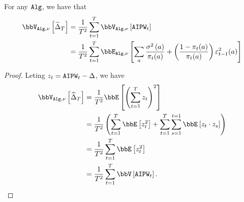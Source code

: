 \begin{lemma}\label{lem:aaipw-variance}
    For any $\texttt{Alg}$, we have that
    \begin{align}
        \V[\alg, \bandit]{\estAIPW[\numRounds]} 
            & = \frac{1}{\numRounds^2} \sum_{\round = 1}^{\numRounds} \V[\alg, \bandit]{\AIPW_\round} \\
            &=\frac{1}{\numRounds^2} \sum_{\round = 1}^{\numRounds}
                \E[\alg, \bandit]{\sum_{\aidx} \frac{\var[\aidx]}{\policy_\round(\aidx)} 
                + \paren{\frac{1 - \policy_\round(\aidx)}{\policy_\round(\aidx)}} \estRewardError^2_{\round - 1}(\aidx)
                }
    \end{align}
\end{lemma}
\begin{proof}
    Leting $z_{t} = \texttt{AIPW}_{t} - \Delta$, we have 
    \begin{align}
        \V[\alg, \bandit]{\estAIPW[\numRounds]} 
            &= \frac{1}{T^2} \E{\paren{\sum_{\round = 1}^{\numRounds} z_\round}^2} \\
            &= \frac{1}{\numRounds^2} \paren{
                \sum_{\round = 1}^{\numRounds} \E{z_\round^2} 
                +  \sum_{\round = 1}^{\numRounds }\sum_{\timeidx = 1}^{\round = 1} \E[]{z_\round \cdot z_{\timeidx}}} \\
            &= \frac{1}{\numRounds^2} \sum_{\round = 1}^{\numRounds} \E{z_\round^2} \\
            &= \frac{1}{\numRounds^2} \sum_{\round = 1}^{\numRounds} \V{\AIPW_\round}. 
    \end{align}


\end{proof}
